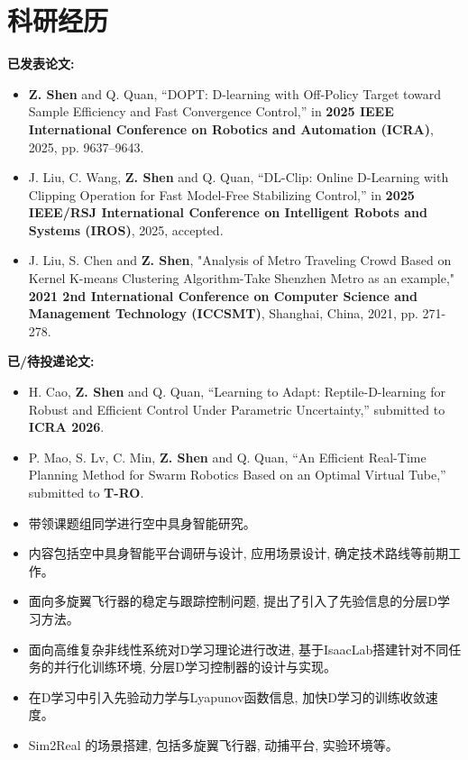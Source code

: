 \section{科研经历}
\textbf{已发表论文:}
\begin{itemize}
  \item \textcolor{ICBlue}{\textbf{Z. Shen}} and Q. Quan, “DOPT: D-learning with Off-Policy Target toward Sample Efficiency and Fast Convergence Control,” in \textcolor{ICBlue}{\textbf{2025 IEEE International Conference on Robotics and Automation (ICRA)}}, 2025, pp. 9637–9643.
  \item J. Liu, C. Wang, \textcolor{ICBlue}{\textbf{Z. Shen}} and Q. Quan, “DL-Clip: Online D-Learning with Clipping Operation for Fast Model-Free Stabilizing Control,” in \textcolor{ICBlue}{\textbf{2025 IEEE/RSJ International Conference on Intelligent Robots and Systems (IROS)}}, 2025, accepted.
  \item J. Liu, S. Chen and \textcolor{ICBlue}{\textbf{Z. Shen}}, "Analysis of Metro Traveling Crowd Based on Kernel K-means Clustering Algorithm-Take Shenzhen Metro as an example," \textcolor{ICBlue}{\textbf{2021 2nd International Conference on Computer Science and Management Technology (ICCSMT)}}, Shanghai, China, 2021, pp. 271-278.
\end{itemize}

\textbf{已/待投递论文:}
\begin{itemize}
  \item H. Cao, \textcolor{ICBlue}{\textbf{Z. Shen}} and Q. Quan, “Learning to Adapt: Reptile-D-learning for Robust and Efficient Control Under Parametric Uncertainty,” submitted to \textcolor{ICBlue}{\textbf{ICRA 2026}}.
  \item P. Mao, S. Lv, C. Min, \textcolor{ICBlue}{\textbf{Z. Shen}} and Q. Quan, “An Efficient Real-Time Planning Method for Swarm Robotics Based on an Optimal Virtual Tube,” submitted to \textcolor{ICBlue}{\textbf{T-RO}}.
\end{itemize}

\begin{itemize}
  \item 带领课题组同学进行空中具身智能研究。
  \item 内容包括空中具身智能平台调研与设计, 应用场景设计, 确定技术路线等前期工作。
\end{itemize}

\begin{itemize}
  \item 面向多旋翼飞行器的稳定与跟踪控制问题, 提出了引入了先验信息的分层D学习方法。
  \item 面向高维复杂非线性系统对D学习理论进行改进, 基于IsaacLab搭建针对不同任务的并行化训练环境, 分层D学习控制器的设计与实现。
  \item 在D学习中引入先验动力学与Lyapunov函数信息, 加快D学习的训练收敛速度。
  \item Sim2Real 的场景搭建, 包括多旋翼飞行器, 动捕平台, 实验环境等。
\end{itemize}

